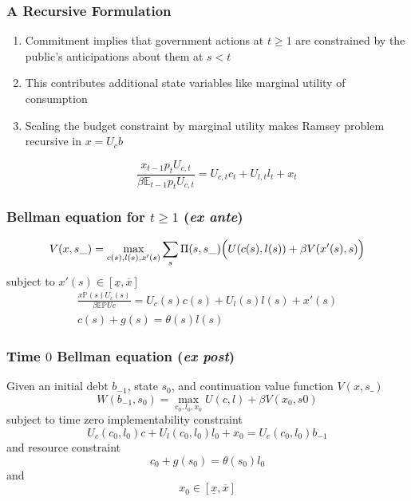 \documentclass{beamer}
\newcommand{\EE}{\mathbb E}
\begin{document}
 \begin{frame}
	\frametitle{A Recursive Formulation}
	
	\begin{enumerate}
	 \item Commitment implies that government actions at $t \geq 1$ are constrained by the public's anticipations about them at $s < t$
	 \item This contributes additional state variables like marginal utility of consumption
	 \item Scaling the budget constraint by marginal utility makes Ramsey problem  recursive in  $x=U_c b$
	
	\[
		\frac{x_{t-1} p_t U_{c,t}}{\beta \EE_{t-1} p_t U_{c,t}}  = U_{c,t}c_t+U_{l,t} l_t + x_t
	\]
	
	\end{enumerate}
	
	
	\end{frame}
	\begin{frame}
	\frametitle{Bellman equation for $t\geq1$ (\textit{ex ante})}
	\[
		V(x,s\_) = \max_{c(s),l(s),x'(s)} \sum_s \Pi(s,s\_)\Bigl(U(c(s),l(s)) + \beta V(x'(s),s)\Bigr)
	\]subject to $x'(s)\in [\underline x,\overline x]$
	\begin{align*}
		\frac{x \mathbb{P}(s) U_c(s)}{\beta\EE \mathbb{P}Uc} =U_c(s)c(s)+U_l(s)l(s) + x'(s)\\
		c(s) + g(s) = \theta(s)l(s)
	\end{align*}
	
 \end{frame}
\begin{frame}
	\frametitle{Time $0$ Bellman equation (\textit{ex post})}
	Given an initial  debt $b_{-1}$, state $s_0$,  and continuation value function $V(x,s\_)$
	\[
		W(b_{-1},s_0) = \max_{c_{0},l_0,x_{0}} U(c,l) +\beta V(x_0,s0)
	\]subject to  time zero implementability constraint
	\[
		U_{c}(c_0,l_0)c + U_l(c_0,l_0) l_0 + x_0 = U_c(c_0,l_0) b_{-1}
	\]and  resource constraint
	\[
		c_0+ g(s_0) = \theta(s_0) l_0
	\]and
	\[
		x_0 \in [\underline x,\overline x]
	\]
\end{frame}
\end{document}

